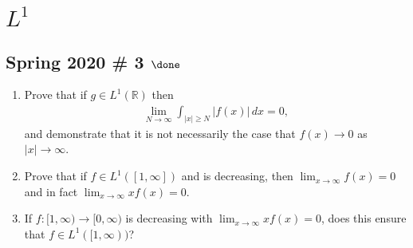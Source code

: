 \hypertarget{l1}{%
\section{\texorpdfstring{\(L^1\)}{L\^{}1}}\label{l1}}

\hypertarget{spring-2020-3-done}{%
\subsection{\texorpdfstring{Spring 2020 \# 3
\(\done\)}{Spring 2020 \# 3 \textbackslash done}}\label{spring-2020-3-done}}

\begin{enumerate}
\def\labelenumi{\alph{enumi}.}
\item
  Prove that if \(g\in L^1({\mathbb{R}})\) then
  \begin{align*}
  \lim_{N\to \infty} \int _{{\left\lvert {x} \right\rvert} \geq N} {\left\lvert {f(x)} \right\rvert} \, dx = 0
  ,\end{align*}
  and demonstrate that it is not necessarily the case that
  \(f(x) \to 0\) as \({\left\lvert {x} \right\rvert}\to \infty\).
\item
  Prove that if \(f\in L^1([1, \infty])\) and is decreasing, then
  \(\lim_{x\to\infty}f(x) =0\) and in fact
  \(\lim_{x\to \infty} xf(x) = 0\).
\item
  If \(f: [1, \infty) \to [0, \infty)\) is decreasing with
  \(\lim_{x\to \infty} xf(x) = 0\), does this ensure that
  \(f\in L^1([1, \infty))\)?
\end{enumerate}

